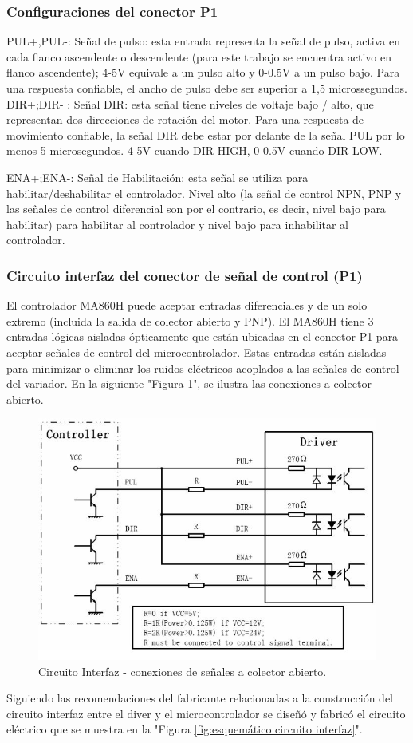 \subsubsection{Configuraciones del conector P1}
PUL+,PUL-: Señal de pulso: esta entrada representa la señal de pulso, activa en cada flanco ascendente o descendente (para este trabajo se encuentra activo en flanco ascendente); 4-5V equivale a un pulso alto y 0-0.5V a un pulso bajo. Para una respuesta confiable, el ancho de pulso debe ser superior a 1,5 microssegundos. 
DIR+;DIR- : Señal DIR: esta señal tiene niveles de voltaje bajo / alto, que representan dos direcciones de rotación del motor. Para una respuesta de movimiento confiable, la señal DIR debe estar por delante de la señal PUL por lo menos 5 microsegundos. 4-5V cuando DIR-HIGH, 0-0.5V cuando DIR-LOW. 

ENA+;ENA-: Señal de Habilitación: esta señal se utiliza para habilitar/deshabilitar el controlador. Nivel alto (la señal de control NPN, PNP y las señales de control diferencial son por el contrario, es decir, nivel bajo para habilitar) para habilitar al controlador y nivel bajo para inhabilitar al controlador.
\subsubsection{Circuito interfaz del conector de señal de control (P1)}
El controlador MA860H puede aceptar entradas diferenciales y de un solo extremo (incluida la salida de colector abierto y PNP). El MA860H tiene 3 entradas lógicas aisladas ópticamente que están ubicadas en el conector P1 para aceptar señales de control del microcontrolador. Estas entradas están aisladas para minimizar o eliminar los ruidos eléctricos acoplados a las señales de control del variador. En la siguiente "Figura \ref{fig:circuito interfaz}", se ilustra las conexiones a colector abierto.
\begin{figure}[h]
\centering
\includegraphics[scale=.65]{./Figures/circuitointerfaz-driver.jpeg}
\caption{Circuito Interfaz - conexiones de señales a colector abierto.}
\label{fig:circuito interfaz}
\end{figure}
Siguiendo las recomendaciones del fabricante relacionadas a la construcción del circuito interfaz entre el diver y el microcontrolador se diseñó y fabricó el circuito eléctrico que se muestra en la "Figura \ref{fig:esquemático circuito interfaz}".

